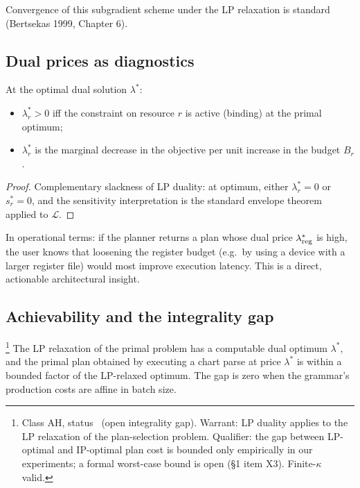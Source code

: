 Convergence of this subgradient scheme under the LP
relaxation is standard (Bertsekas 1999, Chapter 6).

\subsection{Dual prices as diagnostics}

\begin{proposition}
  \label{prop:dual-prices}
  At the optimal dual solution $\lambda^*$:
  \begin{itemize}[nosep]
    \item $\lambda_r^* > 0$ iff the constraint on
      resource $r$ is active (binding) at the primal
      optimum;
    \item $\lambda_r^*$ is the marginal decrease in
      the objective per unit increase in the budget
      $B_r$.
  \end{itemize}
\end{proposition}

\begin{proof}
  Complementary slackness of LP duality: at optimum,
  either $\lambda_r^* = 0$ or $s_r^* = 0$, and the
  sensitivity interpretation is the standard envelope
  theorem applied to $\mathcal{L}$.
\end{proof}

In operational terms: if the planner returns a plan
whose dual price $\lambda_{\operatorname{reg}}^*$ is high, the user
knows that loosening the register budget (e.g.\ by
using a device with a larger register file) would
most improve execution latency. This is a direct,
actionable architectural insight.

\subsection{Achievability and the integrality gap}

\begin{theorem}
  \label{thm:lagrangian}
  \footnote{Class \textsf{AH}, status \omark\ (open
  integrality gap). Warrant: LP duality applies to
  the LP relaxation of the plan-selection problem.
  Qualifier: the gap between LP-optimal and
  IP-optimal plan cost is bounded only empirically
  in our experiments; a formal worst-case bound is
  open (\S1 item X3). Finite-$\kappa$ valid.}
  The LP relaxation of the primal problem has a
  computable dual optimum $\lambda^*$, and the
  primal plan obtained by executing a chart parse at
  price $\lambda^*$ is within a bounded factor of
  the LP-relaxed optimum. The gap is zero when the
  grammar's production costs are affine in batch
  size.
\end{theorem}

